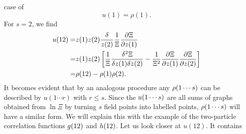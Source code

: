 \documentclass[8.5pt,twoside,twocolumn]{article}
\theoremstyle{standard}
\begin{document}
case of
\begin{equation}
u(1)=\rho(1).
\end{equation}
For $s=2$, we find
\newcommand\ut{u(12)}
\newcommand\rot{\rho(12)}
\begin{equation}
\begin{aligned}
\ut=&z(1)z(2)\frac\dl{z(2)} \frac 1 \Xi \deri{\Xi}{z(1)}\\
=&z(1)z(2)\ed{\frac 1 \Xi \frac{\dl^2 \Xi}{\dl z(1) \dl z(2)} - \frac 1 {\Xi^2} \deri{\Xi}{z(1)} \deri{\Xi}{z(2)}}\\
=&\rot - \rho(1)\rho(2).
\end{aligned}
\label{sPart:UByRho}
\end{equation}
It becomes evident that by an analogous procedure any $\rho(1\cdots s)$ can be described by $u(1\cdots r)$ with $r\le s$.
Since the $u(1\cdots s)$ are all sums of graphs obtained from $\ln \Xi$ by turning $s$ field points into labelled points,
$\rho(1\cdots s)$ will have a similar form.
We will explain this with the example of the two-particle correlation functions
$g(12)$ and $h(12)$. Let us look closer at $\ut$. It contains

\newcommand\twoart{
  \draw(0,0) node[circle,minimum size=.2cm,draw] (A) {};
  \draw(.7,0) node[circle,minimum size=.2cm,draw] (B) {};
  \node at (.23,-.17) {\footnotesize 1};
  \node at (.93,-.17) {\footnotesize 2};
}
\newcommand\threeart{
\begin{pgfonlayer}{main}
  \draw(0,0) node[circle,minimum size=.2cm,fill=white,draw] (A) {};
  \draw(.7,0) node[circle,minimum size=.2cm,fill=white,draw] (B) {};
  \draw(.35,.7) node[circle,minimum size=.2cm,fill=black,draw] (C) {};
  \node at (.23,-.17) {\footnotesize 1};
  \node at (.93,-.17) {\footnotesize 2};
\end{pgfonlayer}
}
\newcommand\fourart{
\begin{pgfonlayer}{main}
  \draw(0,0) node[circle,minimum size=.2cm,fill=white,draw] (A) {};
  \draw(.7,0) node[circle,minimum size=.2cm,draw,fill=white] (B) {};
  \draw(.7,.7) node[circle,minimum size=.2cm,draw,fill=black] (C) {};
  \draw(0,.7) node[circle,minimum size=.2cm,draw,fill=black] (D) {};
  \node at (.23,-.17) {\footnotesize 1};
  \node at (.93,-.17) {\footnotesize 2};
\end{pgfonlayer}
}
\end{document}

